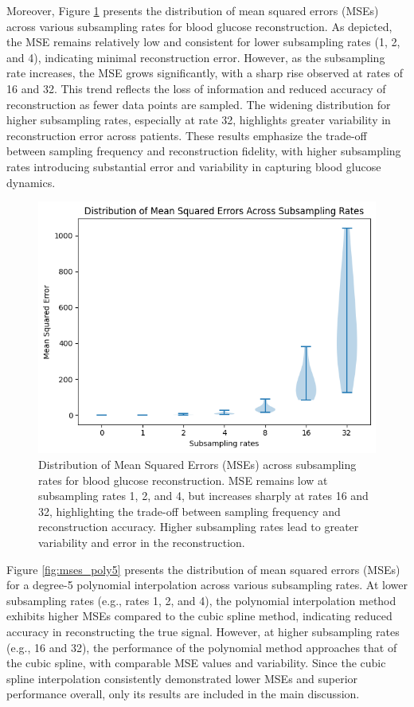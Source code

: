 Moreover, Figure \ref{fig:mses} presents the distribution of mean squared errors (MSEs) across various subsampling rates for blood glucose reconstruction. As depicted, the MSE remains relatively low and consistent for lower subsampling rates (1, 2, and 4), indicating minimal reconstruction error. However, as the subsampling rate increases, the MSE grows significantly, with a sharp rise observed at rates of 16 and 32. This trend reflects the loss of information and reduced accuracy of reconstruction as fewer data points are sampled. The widening distribution for higher subsampling rates, especially at rate 32, highlights greater variability in reconstruction error across patients.
These results emphasize the trade-off between sampling frequency and reconstruction fidelity, with higher subsampling rates introducing substantial error and variability in capturing blood glucose dynamics.
\begin{figure}[h] %
	\centering
	\includegraphics[width=\linewidth]{Figures/distribution_mses.png} %
	\caption{Distribution of Mean Squared Errors (MSEs) across subsampling rates for blood glucose reconstruction. MSE remains low at subsampling rates 1, 2, and 4, but increases sharply at rates 16 and 32, highlighting the trade-off between sampling frequency and reconstruction accuracy. Higher subsampling rates lead to greater variability and error in the reconstruction.}
	\label{fig:mses}  %
\end{figure}
Figure \ref{fig:mses_poly5} presents the distribution of mean squared errors (MSEs) for a degree-5 polynomial interpolation across various subsampling rates. At lower subsampling rates (e.g., rates 1, 2, and 4), the polynomial interpolation method exhibits higher MSEs compared to the cubic spline method, indicating reduced accuracy in reconstructing the true signal. However, at higher subsampling rates (e.g., 16 and 32), the performance of the polynomial method approaches that of the cubic spline, with comparable MSE values and variability. Since the cubic spline interpolation consistently demonstrated lower MSEs and superior performance overall, only its results are included in the main discussion.
